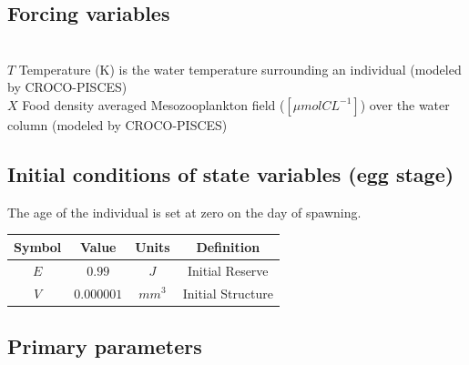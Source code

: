 \subsection*{Forcing variables}
\hfill \\

$T$ Temperature (K) is the water temperature surrounding an individual (modeled by CROCO-PISCES)\\

$X$ Food density averaged Mesozooplankton field ($\left[ \mu mol CL^{-1} \right]$) over the water column (modeled by CROCO-PISCES)\\

\subsection*{Initial conditions of state variables (egg stage)}

The age of the individual is set at zero on the day of spawning.\\

\begin{tabular}{|c|c|c|c|}
\hline 
Symbol  & Value      & Units  & Definition      \\ 
\hline 
$E$     & $0.99$     & $J$    & Initial Reserve \\ 
$V$     & $0.000001$ & $mm^3$ & Initial Structure\\
\hline 
\end{tabular} 

\subsection*{Primary parameters}

